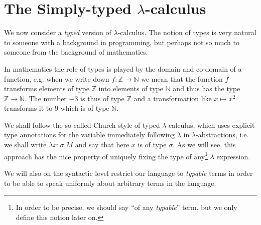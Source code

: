 \section{The Simply-typed $\lambda$-calculus}

We now consider a \emph{typed} version of $\lambda$-calculus. The notion of
types is very natural to someone with a background in programming, but perhaps
not so much to someone from the background of mathematics.

In mathematics the role of types is played by the domain and co-domain of a
function, e.g. when we write down $f: \mathbb{Z} \rightarrow \mathbb{N}$ we
mean that the function $f$ transforms elements of type $\mathbb{Z}$ into
elements of type $\mathbb{N}$ and thus has the type $\mathbb{Z} \rightarrow
\mathbb{N}$. The number $-3$ is thus of type $\mathbb{Z}$ and a transformation like
$x \mapsto x^2$ transforms it to $9$ which is of type $\mathbb{N}$.

We shall follow the so-called Church style of typed $\lambda$-calculus, which
uses explicit type annotations for the variable immediately following
$\lambda$ in $\lambda$-abstractions, i.e. we shall write $\lambda
x\!:\!\sigma\; M$ and say that here $x$ is of type $\sigma$. As we will see,
this approach has the nice property of uniquely fixing the type of
any\footnote{
    In order to be precise, we should say ``of any \emph{typable}''
    term, but we only define this notion later on.}
$\lambda$ expression.

We will also on the syntactic level restrict our language to \emph{typable}
terms in order to be able to speak uniformly about arbitrary terms in the
language.

